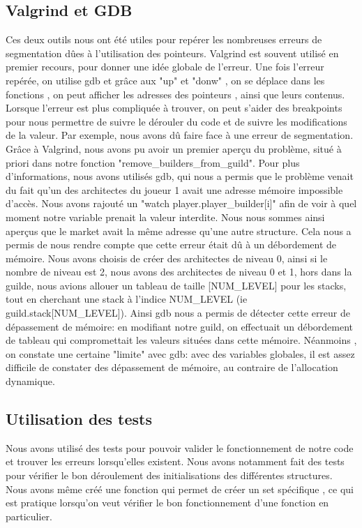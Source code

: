 \documentclass{article}
\begin{document}
    \subsection{Valgrind et GDB} %
    \hspace{1em} Ces deux outils nous ont été utiles pour repérer les nombreuses erreurs de segmentation dûes à l'utilisation des pointeurs. Valgrind est souvent utilisé en premier recours, pour donner une idée globale de l'erreur. Une fois l'erreur repérée, on utilise gdb et grâce aux "up" et "donw" , on se déplace dans les fonctions , on peut afficher les adresses des pointeurs , ainsi que leurs contenus. Lorsque l'erreur est plus compliquée à trouver, on peut s'aider des breakpoints pour nous permettre de suivre le dérouler du code et de suivre les modifications de la valeur. Par exemple, nous avons dû faire face à une erreur de segmentation. Grâce à Valgrind, nous avons pu avoir un premier aperçu du problème, situé à priori dans notre fonction "remove\_builders\_from\_guild". Pour plus d'informations, nous avons utilisés gdb, qui nous a permis que le problème venait du fait qu'un des architectes du joueur 1 avait une adresse mémoire impossible d'accès. Nous avons rajouté un "watch player.player\_builder[i]" afin de voir à quel moment notre variable prenait la valeur interdite. Nous nous sommes ainsi aperçus que le market avait la même adresse qu'une autre structure. Cela nous a permis de nous rendre compte que cette erreur était dû à un débordement de mémoire. Nous avons choisis de créer des architectes de niveau 0, ainsi si le nombre de niveau est 2, nous avons des architectes de niveau 0 et 1, hors dans la guilde, nous avions allouer un tableau de taille [NUM\_LEVEL] pour les stacks, tout en cherchant une stack à l'indice NUM\_LEVEL (ie guild.stack[NUM\_LEVEL]). Ainsi gdb nous a permis de détecter cette erreur de dépassement de mémoire: en modifiant notre guild, on effectuait un débordement de tableau qui compromettait les valeurs situées dans cette mémoire. Néanmoins , on constate une certaine "limite" avec gdb: avec des variables globales, il est assez difficile de constater des dépassement de mémoire, au contraire de l'allocation dynamique.

    \subsection{Utilisation des tests}
     \hspace{1em} Nous avons utilisé des tests pour pouvoir valider le fonctionnement de notre code et trouver les erreurs lorsqu'elles existent.
     Nous avons notamment fait des tests pour vérifier le bon déroulement des initialisations des différentes structures. Nous avons même créé une fonction qui permet de créer un set spécifique , ce qui est pratique lorsqu'on veut vérifier le bon fonctionnement d'une fonction en particulier. 
\end{document}

